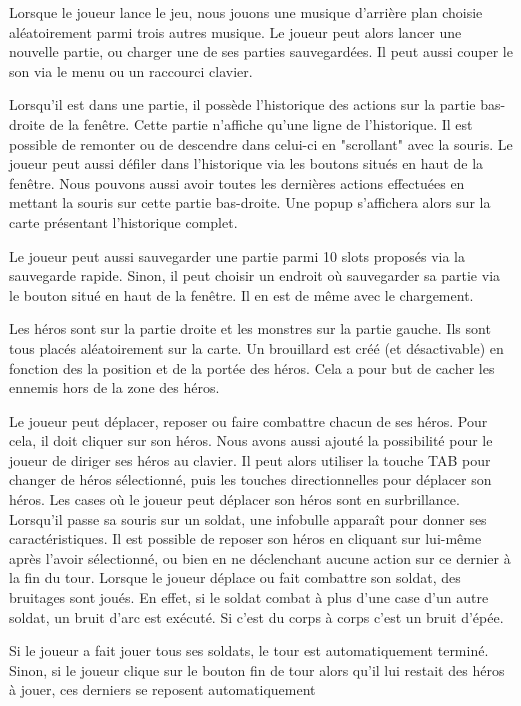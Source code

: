 \documentclass{article}
\begin{document}
Lorsque le joueur lance le jeu, nous jouons une musique d'arrière plan choisie aléatoirement parmi trois autres musique.
Le joueur peut alors lancer une nouvelle partie, ou charger une de ses parties sauvegardées.
Il peut aussi couper le son via le menu ou un raccourci clavier.

Lorsqu'il est dans une partie, il possède l'historique des actions sur la partie bas-droite de la fenêtre. 
Cette partie n'affiche qu'une ligne de l'historique. Il est possible de remonter ou de descendre dans celui-ci en "scrollant" avec la souris.
Le joueur peut aussi défiler dans l'historique via les boutons situés en haut de la fenêtre.
Nous pouvons aussi avoir toutes les dernières actions effectuées en mettant la souris sur cette partie bas-droite.
Une popup s'affichera alors sur la carte présentant l'historique complet.

Le joueur peut aussi sauvegarder une partie parmi 10 slots proposés via la sauvegarde rapide.
Sinon, il peut choisir un endroit où sauvegarder sa partie via le bouton situé en haut de la fenêtre.
Il en est de même avec le chargement.

Les héros sont sur la partie droite et les monstres sur la partie gauche. Ils sont tous placés aléatoirement sur la carte.
Un brouillard est créé (et désactivable) en fonction des la position et de la portée des héros. Cela a pour but de cacher les ennemis hors de la zone des héros.

Le joueur peut déplacer, reposer ou faire combattre chacun de ses héros.
Pour cela, il doit cliquer sur son héros. Nous avons aussi ajouté la possibilité pour le joueur de diriger ses héros au clavier.
Il peut alors utiliser la touche TAB pour changer de héros sélectionné, puis les touches directionnelles pour déplacer son héros.
Les cases où le joueur peut déplacer son héros sont en surbrillance.
Lorsqu'il passe sa souris sur un soldat, une infobulle apparaît pour donner ses caractéristiques.
Il est possible de reposer son héros en cliquant sur lui-même après l'avoir sélectionné, ou bien en ne déclenchant aucune action sur ce dernier à la fin du tour.
Lorsque le joueur déplace ou fait combattre son soldat, des bruitages sont joués.
En effet, si le soldat combat à plus d'une case d'un autre soldat, un bruit d'arc est exécuté.
Si c'est du corps à corps c'est un bruit d'épée.

Si le joueur a fait jouer tous ses soldats, le tour est automatiquement terminé. 
Sinon, si le joueur clique sur le bouton fin de tour alors qu'il lui restait des héros à jouer, ces derniers se reposent automatiquement
\end{document}
